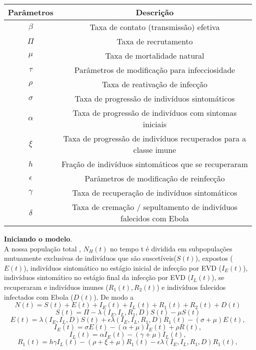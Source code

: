 \documentclass[12pt,a4paper]{article}
\begin{document}
\begin{center}
\begin{tabular}{||c c||} 
 \hline
 Parâmetros & Descrição\\ [0.5ex] 
 \hline\hline
 $\beta$ & Taxa de contato (transmissão) efetiva  \\ 
 \hline
 $\Pi$ & Taxa de recrutamento  \\
 \hline
 $\mu$ & Taxa de mortalidade natural \\
 \hline
 $\tau$ & Parâmetros de modificação para infecciosidade \\
 \hline
 $\rho$ & Taxa de reativação de infecção\\
 \hline
 $\sigma$ & Taxa de progressão de indivíduos sintomáticos \\[1ex]
 \hline
 $\alpha$ & Taxa de progressão de indivíduos com sintomas iniciais\\
 \hline
 $\xi$ & Taxa de progressão de indivíduos recuperados para a classe imune\\
 \hline
 $h$ & Fração de indivíduos sintomáticos que se recuperaram\\
 \hline
 $\epsilon$ & Parâmetros de modificação de reinfecção\\
 \hline
 $\gamma$ & Taxa de recuperação de indivíduos sintomáticos\\
 \hline
 $\delta$ & Taxa de cremação / sepultamento de indivíduos falecidos com Ebola\\ [1ex]
 \hline
\end{tabular}
\end{center}
\textbf{Iniciando o modelo}. \vspace{3mm}\\
A nossa população total , $N_H(t)$ no tempo t é dividida em subpopulações mutuamente exclusivas de indivíduos que são suscetíveis($S(t)$), expostos ($E(t)$), indivíduos sintomático no estágio inicial de infecção por EVD ($I_E(t)$), indivíduos sintomático no estágio final da infecção por EVD ($I_L(t)$), se recuperaram e indivíduos imunes ($R_1(t), R_2(t)$) e indivíduos falecidos infectados com Ebola ($D(t)$). De modo a
\\ $$N(t) = S(t) + E(t) + I_E(t) + I_L(t) + R_1(t) + R_2(t) + D(t)$$
$$S(t) = \Pi -\lambda(I_E,I_L,R_1,D)S(t) - \mu S(t)$$
$$E(t) = \lambda(I_E,I_L,D)S(t) + \epsilon \lambda(I_E,I_L,R_1,D)R_1(t)- (\sigma + \mu)E(t),$$
$$I_E(t) = \sigma E(t)-(\alpha + \mu)I_E(t) + \rho R(t),$$
$$I_L(t) = \alpha I_E(t) - (\gamma + \mu)I_L(t),$$
$$R_1(t) = h \gamma I_L(t) - (\rho + \xi + \mu)R_1(t) - \epsilon \lambda(I_E,I_L,R_1,D)R_1(t),$$
\end{document}
